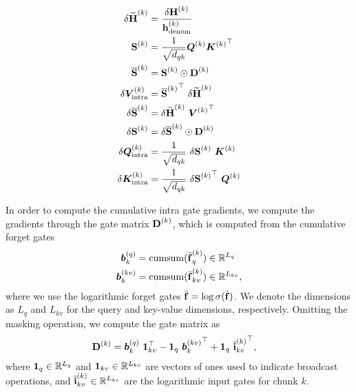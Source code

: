 \documentclass{article}
\begin{document}
    \begin{align}
        \delta \widetilde{\bm{\mathrm{H}}}^{(k)} & = \frac{\delta \bm{\mathrm{H}}^{(k)}}{\bm{\mathrm{h}}^{(k)}_{\text{denom}}}          \\
        \bm{\mathrm{S}}^{(k)}                    & = \frac{1}{\sqrt{d_{qk}}} {\bm{Q}^{(k)}} {\bm{K}^{(k)}}^\top                 \\
        \overline{\bm{\mathrm{S}}}^{(k)}         & = \bm{\mathrm{S}}^{(k)} \odot \bm{\mathrm{D}}^{(k)}                                  \\
        \delta \bm{V}^{(k)}_\text{intra}     & = {\overline{\bm{\mathrm{S}}}^{(k)}}^\top \ \delta \widetilde{\bm{\mathrm{H}}}^{(k)} \\
        \delta \overline{\bm{\mathrm{S}}}^{(k)}  & = \delta \widetilde{\bm{\mathrm{H}}}^{(k)} \ {\bm{V}^{(k)}}^\top                 \\
        \delta {\bm{\mathrm{S}}}^{(k)}           & = \delta \overline{\bm{\mathrm{S}}}^{(k)} \odot \bm{\mathrm{D}}^{(k)}                \\
        \delta \bm{Q}^{(k)}_\text{intra}     & = \frac{1}{\sqrt{d_{qk}}} \ \delta {\bm{\mathrm{S}}}^{(k)} \ \bm{K}^{(k)}        \\
        \delta \bm{K}^{(k)}_\text{intra}     & = \frac{1}{\sqrt{d_{qk}}} \ \delta {\bm{\mathrm{S}}^{(k)}}^\top \ \bm{Q}^{(k)}
    \end{align}

    In order to compute the cumulative intra gate gradients, we compute the gradients through the gate matrix $\bm{\mathrm{D}}^{(k)}$, which is computed from the cumulative forget gates
    \begin{align}
        \bm{b}_k^{(q)}  & = \mathrm{cumsum}( \bar{\bm{\mathrm{f}}}^{(k)}_q ) \in \mathbb{R}^{L_q}       \\
        \bm{b}_k^{(kv)} & = \mathrm{cumsum}( \bar{\bm{\mathrm{f}}}^{(k)}_{kv}) \in \mathbb{R}^{L_{kv}},
    \end{align}
    where we use the logarithmic forget gates $\bar{\bm{\mathrm{f}}} = \log \sigma(\tilde{\bm{\mathrm{f}}})$.
    We denote the dimensions as $L_q$ and $L_{kv}$ for the query and key-value dimensions, respectively.
    Omitting the masking operation, we compute the gate matrix as
    \begin{align}
        \bm{\rD}^{(k)} & = \Bb_k^{(q)} \ \bm{1}_{kv}^\top - \bm{1}_q \ {\Bb_k^{(kv)}}^\top + \bm{1}_q \ {\overline{\bm{\Ri}}_{kv}^{(k)}}^\top,
    \end{align}
    where $\bm{1}_q \in \mathbb{R}^{L_q}$ and $\bm{1}_{kv} \in \mathbb{R}^{L_{kv}}$ are vectors of ones used to indicate broadcast operations, and $\overline{\bm{\mathrm{i}}}_{kv}^{(k)} \in \mathbb{R}^{L_{kv}}$ are the logarithmic input gates for chunk $k$.
\end{document}
